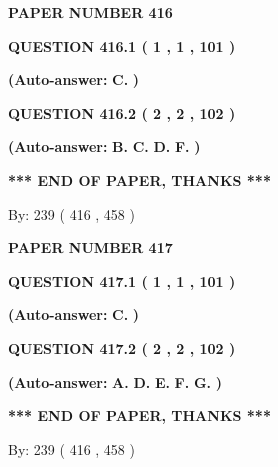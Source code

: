 \documentclass[12pt]{article}
\begin{document}
 
 
   
   
   
   
   
   
   
   
   
   
\setcounter{page}{ 
   416001 } 
   
   
 {\textbf{ \Large{ PAPER NUMBER  416  }}}
   
   
  
  
{\textbf{\large{QUESTION
416.1 
 ( 1 , 1 , 101 )
}}}
 
 
{\textbf{(Auto-answer:}}
{\textbf{\large{
C.}}}
{\textbf{)}}
 
 
  
  
{\textbf{\large{QUESTION
416.2 
 ( 2 , 2 , 102 )
}}}
 
 
{\textbf{(Auto-answer:}}
{\textbf{\large{
B.}}}
{\textbf{\large{
C.}}}
{\textbf{\large{
D.}}}
{\textbf{\large{
F.}}}
{\textbf{)}}
 
 
   
   
\vspace{1.0in} 
{\textbf{\large{ *** END OF PAPER, THANKS *** }}} 
   
   
\hspace{1.0in} By: 
 239 ( 416 ,  458 )
   
   
   
   
\newpage 
\setcounter{page}{ 
   417001 } 
   
   
 {\textbf{ \Large{ PAPER NUMBER  417  }}}
   
   
  
  
{\textbf{\large{QUESTION
417.1 
 ( 1 , 1 , 101 )
}}}
 
 
{\textbf{(Auto-answer:}}
{\textbf{\large{
C.}}}
{\textbf{)}}
 
 
  
  
{\textbf{\large{QUESTION
417.2 
 ( 2 , 2 , 102 )
}}}
 
 
{\textbf{(Auto-answer:}}
{\textbf{\large{
A.}}}
{\textbf{\large{
D.}}}
{\textbf{\large{
E.}}}
{\textbf{\large{
F.}}}
{\textbf{\large{
G.}}}
{\textbf{)}}
 
 
   
   
\vspace{1.0in} 
{\textbf{\large{ *** END OF PAPER, THANKS *** }}} 
   
   
\hspace{1.0in} By: 
 239 ( 416 ,  458 )
   
\end{document}

